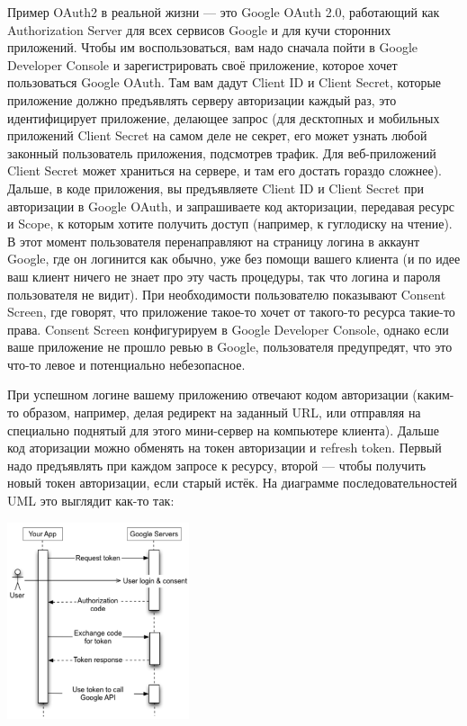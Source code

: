 \documentclass{../mcstext}
\begin{document}
Пример OAuth2 в реальной жизни --- это Google OAuth 2.0, работающий как Authorization Server для всех сервисов Google и для кучи сторонних приложений. Чтобы им воспользоваться, вам надо сначала пойти в Google Developer Console и зарегистрировать своё приложение, которое хочет пользоваться Google OAuth. Там вам дадут Client ID и Client Secret, которые приложение должно предъявлять серверу авторизации каждый раз, это идентифицирует приложение, делающее запрос (для десктопных и мобильных приложений Client Secret на самом деле не секрет, его может узнать любой законный пользователь приложения, подсмотрев трафик. Для веб-приложений Client Secret может храниться на сервере, и там его достать гораздо сложнее). Дальше, в коде приложения, вы предъявляете Client ID и Client Secret при авторизации в Google OAuth, и запрашиваете код акторизации, передавая ресурс и Scope, к которым хотите получить доступ (например, к гуглодиску на чтение). В этот момент пользователя перенаправляют на страницу логина в аккаунт Google, где он логинится как обычно, уже без помощи вашего клиента (и по идее ваш клиент ничего не знает про эту часть процедуры, так что логина и пароля пользователя не видит). При необходимости пользователю показывают Consent Screen, где говорят, что приложение такое-то хочет от такого-то ресурса такие-то права. Consent Screen конфигурируем в Google Developer Console, однако если ваше приложение не прошло ревью в Google, пользователя предупредят, что это что-то левое и потенциально небезопасное.

При успешном логине вашему приложению отвечают кодом авторизации (каким-то образом, например, делая редирект на заданный URL, или отправляя на специально поднятый для этого мини-сервер на компьютере клиента). Дальше код аторизации можно обменять на токен авторизации и refresh token. Первый надо предъявлять при каждом запросе к ресурсу, второй --- чтобы получить новый токен авторизации, если старый истёк. На диаграмме последовательностей UML это выглядит как-то так:

\begin{center}
    \includegraphics[width=0.4\textwidth]{googleOAuth.png}
\end{center}
\end{document}
